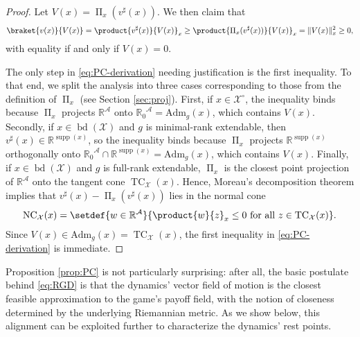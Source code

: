 \documentclass[reqno]{amsart}
\DeclarePairedDelimiter{\norm}{\lVert}{\rVert}
\theoremstyle{plain}
\theoremstyle{definition}
\theoremstyle{remark}
\numberwithin{equation}{section}
\numberwithin{theorem}{section}
\begin{document}
\begin{proof}
Let ${V}(x) = \operatorname{\Pi}_{x}({v}^{\sharp}(x))$.
We then claim that
\begin{equation}
\label{eq:PC-derivation}
\braket{{v}(x)}{{V}(x)}
	= \product{{v}^{\sharp}(x)}{{V}(x)}_x
	\geq \product{\operatorname{\Pi}_{x}({v}^{\sharp}(x))}{{V}(x)}_x
	= \norm{{V}(x)}^{2}_x
	\geq0,
\end{equation}
with equality if and only if ${V}(x) = 0$.

The only step in \eqref{eq:PC-derivation} needing justification is the first inequality.
To that end, we split the analysis into three cases corresponding to those from the definition of $\operatorname{\Pi}_{x}$ (see Section \ref{sec:proj}).
First, if $x \in {{\mathcal{X}}^{\circ}}$, the inequality binds because $\operatorname{\Pi}_{x}$ projects $ {\mathbb{R}}^{\mathcal{A}}$ onto ${{\mathbb{R}}_{0}}^{\mathcal{A}} = {\textrm{Adm}_{g}}(x) $, which contains ${V}(x)$.
Secondly, if $x \in \operatorname{bd}({\mathcal{X}})$ and $g$ is minimal-rank extendable, then ${v}^{\sharp}(x) \in {\mathbb{R}}^{\operatorname{supp}(x)}$, so the inequality binds because $\operatorname{\Pi}_{x}$ projects ${\mathbb{R}}^{\operatorname{supp}(x)}$ orthogonally onto ${{\mathbb{R}}_{0}}^{\mathcal{A}} \cap {\mathbb{R}}^{\operatorname{supp}(x)} = {\textrm{Adm}_{g}}(x) $, which contains ${V}(x)$.
Finally, if $x \in \operatorname{bd}({\mathcal{X}})$ and $g$ is full-rank extendable, $\operatorname{\Pi}_{x}$ is the closest point projection of ${\mathbb{R}}^{\mathcal{A}}$ onto the tangent cone $\operatorname{TC}_{\mathcal{X}}(x)$.
Hence, Moreau's decomposition theorem \citep{HUL01} implies that ${v}^{\sharp}(x) - \operatorname{\Pi}_{x}({v}^{\sharp}(x))$ lies in the normal cone 
\begin{equation}
\label{eq:ncone}
\operatorname{NC}_{\mathcal{X}}(x)
	= \setdef{w\in{\mathbb{R}}^{\mathcal{A}}}{\product{w}{z}_{x}\leq 0 \text{ for all } z\in \operatorname{TC}_{\mathcal{X}}(x)}.
\end{equation} 
Since ${V}(x)\in{\textrm{Adm}_{g}}(x)= \operatorname{TC}_{\mathcal{X}}(x)$, the first inequality in \eqref{eq:PC-derivation} is immediate.
\end{proof}

Proposition \ref{prop:PC} is not particularly surprising:
after all, the basic postulate behind \eqref{eq:RGD} is that the dynamics' vector field of motion is the closest feasible approximation to the game's payoff field, with the notion of closeness determined by the underlying Riemannian metric.
As we show below, this alignment can be exploited further to characterize the dynamics' rest points.
\end{document}
